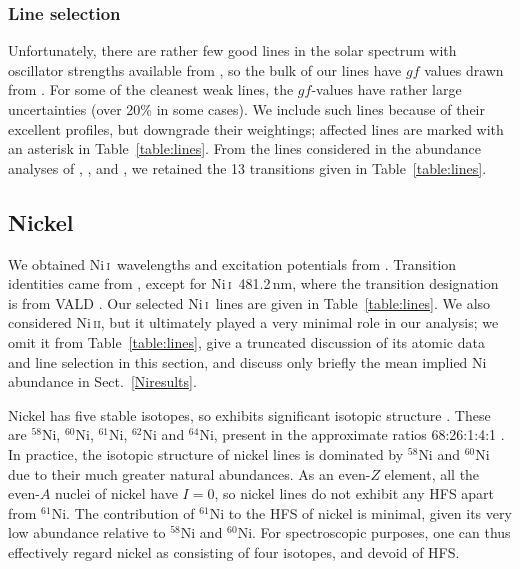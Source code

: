 \documentclass[traditabstract]{aa}
\newcommand{\altnii}{Ni\,\textsc{i}}
\newcommand{\altniii}{Ni\,\textsc{ii}}
\newcommand{\nii}{\altnii\ }
\begin{document}
\subsubsection{Line selection}
\label{Colineselection}

Unfortunately, there are rather few good lines in the solar spectrum with oscillator strengths available from
\citet{Nitz99}, so the bulk of our lines have $gf$ values drawn from \citet{Cardon82}.  For some of the cleanest weak lines, the \citeauthor{Cardon82} $gf$-values have rather large uncertainties (over 20\% in some cases).  We include such lines because of their excellent profiles, but downgrade their weightings; affected lines are marked with an asterisk in Table~\ref{table:lines}.  From the lines considered in the abundance analyses of \citet{Cardon82}, \citet{Biemont78b}, \citet{Kerola76} and \citet{Holweger71}, we retained the 13 transitions given in Table~\ref{table:lines}.

\subsection{Nickel}
\label{Niatomicdata}

We obtained \nii wavelengths and excitation potentials from \citet{Litzen93}.  Transition identities came from
\citet{Wickliffe97}, except for \mbox{\nii 481.2\,nm}, where the transition designation is from VALD \citep{VALD}.
Our selected \nii lines are given in 
Table~\ref{table:lines}.  We also considered \altniii, but it ultimately played a very minimal role in our
analysis; we omit it from Table~\ref{table:lines}, give a truncated discussion of its atomic data
and line selection in this section, and discuss only briefly the mean implied Ni abundance in Sect.~\ref{Niresults}.

Nickel has five stable isotopes, so exhibits significant isotopic structure
\citep[as seen by e.g.][]{Brault81, Melendez99a}.  These are $^{58}$Ni, $^{60}$Ni, $^{61}$Ni, $^{62}$Ni and $^{64}$Ni,
present in the approximate ratios 68:26:1:4:1 \citep{IUPAC98}.  In practice, the isotopic structure of nickel lines is dominated by
$^{58}$Ni and $^{60}$Ni due to their much greater natural abundances.  As an even-$Z$ element, all the even-$A$ nuclei of nickel
have $I=0$, so nickel lines do not exhibit any HFS apart from $^{61}$Ni.  The contribution of $^{61}$Ni to the HFS of nickel is minimal,
given its very low abundance relative to $^{58}$Ni and $^{60}$Ni.  
For spectroscopic purposes, one can thus effectively regard nickel as consisting of four isotopes, and devoid of HFS.
\end{document}
